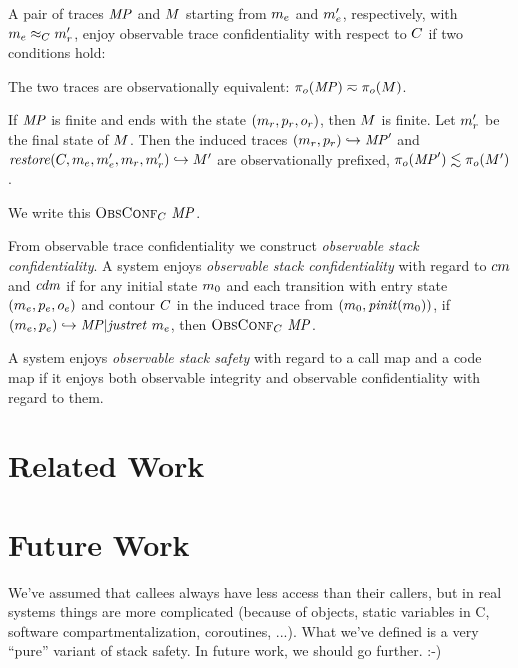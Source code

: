 \documentclass[acmsmall,review,anonymous]{acmart}\settopmatter{printfolios=true,printccs=false,printacmref=false}
\begin{document}
      A pair of traces \(\mathit{MP}\) and \(M\) starting from \(m_e\) and
      \(m_e'\), respectively, with \(m_e \approx_C m_r'\),
      enjoy observable trace confidentiality with respect to \(C\) if
      two conditions hold:

      The two traces are observationally equivalent: \(\pi_o(\mathit{MP}) \eqsim
      \pi_o(M)\).

      If \(\mathit{MP}\) is finite and ends with the state
      \((m_r,p_r,o_r)\), then \(M\) is finite. Let
      \(m_r'\) be the final state of \(M\). Then the induced traces
      \((m_r,p_r) \hookrightarrow \mathit{MP}'\) and
      \(\mathit{restore}(C,m_e,m_e',m_r,m_r')
      \hookrightarrow M'\) are observationally prefixed,
      \(\pi_o(\mathit{MP}') \lesssim \pi_o(M')\).

      We write this \(\text{\sc ObsConf}_C ~ \mathit{MP}\).


      From observable trace confidentiality we construct {\em observable stack
      confidentiality}. A system enjoys {\em observable stack confidentiality}
      with regard to \(cm\) and \(\mathit{cdm}\) if for any initial state
      \(m_0\) and each transition with entry state
      \((m_e,p_e,o_e)\) and contour \(C\) in the
      induced trace from \((m_0,\mathit{pinit}(m_0))\), if
      \((m_e,p_e) \hookrightarrow \mathit{MP} | \mathit{justret}\ m_e\),
      then \(\text{\sc ObsConf}_C ~ \mathit{MP}\).


      A system enjoys {\em observable stack safety} with regard to a call map
      and a code map if it enjoys both observable integrity and observable
      confidentiality with regard to them.


\section{Related Work}
\label{sec:relwork}

\section{Future Work}
\label{sec:future}

We've assumed that callees always have less access than their callers, but
in real systems things are more complicated (because of objects, static
variables in C, software compartmentalization, coroutines, ...).  What we've
defined is a very ``pure'' variant of stack safety.  In future work, we
should go further. :-)
\end{document}
